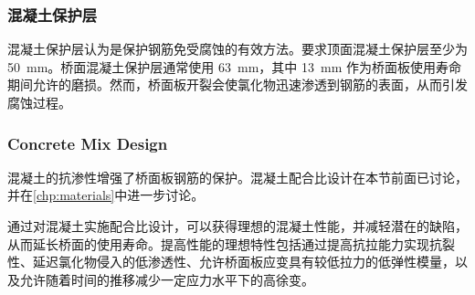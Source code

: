 \subsubsection{混凝土保护层}
混凝土保护层认为是保护钢筋免受腐蚀的有效方法。\lrfd 要求顶面混凝土保护层至少为 \qty{50}{mm}。桥面混凝土保护层通常使用 \qty{63}{mm}，其中 \qty{13}{mm} 作为桥面板使用寿命期间允许的磨损。然而，桥面板开裂会使氯化物迅速渗透到钢筋的表面，从而引发腐蚀过程。

\subsubsection{Concrete Mix Design}
混凝土的抗渗性增强了桥面板钢筋的保护。混凝土配合比设计在本节前面已讨论，并在\cref{chp:materials}中进一步讨论。

通过对混凝土实施配合比设计，可以获得理想的混凝土性能，并减轻潜在的缺陷，从而延长桥面的使用寿命。提高性能的理想特性包括通过提高抗拉能力实现抗裂性、延迟氯化物侵入的低渗透性、允许桥面板应变具有较低拉力的低弹性模量，以及允许随着时间的推移减少一定应力水平下的高徐变。


